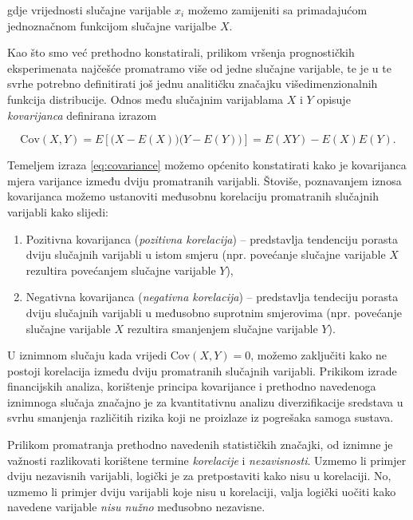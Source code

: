 \documentclass[a4paper,12pt,oneside]{memoir}
\begin{document}
                gdje vrijednosti slučajne varijable $x_i$ možemo zamijeniti sa primadajućom jednoznačnom funkcijom slučajne varijalbe $X$.

                Kao što smo već prethodno konstatirali, prilikom vršenja prognostičkih eksperimenata najčešće promatramo više od jedne slučajne varijable, te je u te svrhe potrebno definitirati još jednu analitičku značajku višedimenzionalnih funkcija distribucije. Odnos među slučajnim varijablama $X$ i $Y$ opisuje \textit{kovarijanca} \cite{Bahovec} definirana izrazom

                \begin{equation}
                    \mathrm{Cov}(X,Y)=E\left[\big(X-E(X)\big)\big(Y-E(Y)\big)\right]=E(XY)-E(X)E(Y).
                    \label{eq:covariance}
                \end{equation}

                Temeljem izraza \eqref{eq:covariance} možemo općenito konstatirati kako je kovarijanca mjera varijance između dviju promatranih varijabli. Štoviše, poznavanjem iznosa kovarijanca možemo ustanoviti međusobnu korelaciju promatranih slučajnih varijabli kako slijedi:

                \begin{enumerate}
                    \item Pozitivna kovarijanca (\textit{pozitivna korelacija}) -- predstavlja tendenciju porasta dviju slučajnih varijabli u istom smjeru (npr. povećanje slučajne varijable $X$ rezultira povećanjem slučajne varijable $Y$),
                    \item Negativna kovarijanca (\textit{negativna korelacija}) -- predstavlja tendeciju porasta dviju slučajnih varijabli u međusobno suprotnim smjerovima (npr. povećanje slučajne varijable $X$ rezultira smanjenjem slučajne varijable $Y$).
                \end{enumerate}

                U iznimnom slučaju kada vrijedi $\mathrm{Cov}(X,Y)=0$, možemo zaključiti kako ne postoji korelacija između dviju promatranih slučajnih varijabli. Prikikom izrade financijskih analiza, korištenje principa kovarijance i prethodno navedenoga iznimnoga slučaja značajno je za kvantitativnu analizu diverzifikacije sredstava u svrhu smanjenja različitih rizika koji ne proizlaze iz pogrešaka samoga sustava.
                
                Prilikom promatranja prethodno navedenih statističkih značajki, od iznimne je važnosti razlikovati korištene termine \textit{korelacije} i \textit{nezavisnosti}. Uzmemo li primjer dviju nezavisnih varijabli, logički je za pretpostaviti kako nisu u korelaciji. No, uzmemo li primjer dviju varijabli koje nisu u korelaciji, valja logički uočiti kako navedene varijable \textit{nisu nužno} međusobno nezavisne.
\end{document}
